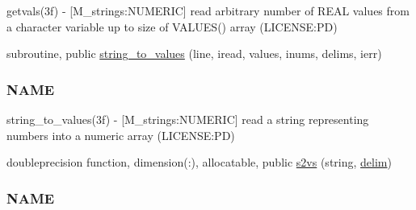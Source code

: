 \begin{DoxyCompactItemize}
\begin{DoxyCompactList}
getvals(3f) -\/ \mbox{[}M\+\_\+strings\+:N\+U\+M\+E\+R\+IC\mbox{]} read arbitrary number of R\+E\+AL values from a character variable up to size of V\+A\+L\+U\+E\+S() array (L\+I\+C\+E\+N\+SE\+:PD) \end{DoxyCompactList}\item 
subroutine, public \mbox{\hyperlink{namespacem__strings_af3767887ce5c2373a6d9061ea6664bfc}{string\+\_\+to\+\_\+values}} (line, iread, values, inums, delims, ierr)
\begin{DoxyCompactList}\small\item\em \subsubsection*{N\+A\+ME}

string\+\_\+to\+\_\+values(3f) -\/ \mbox{[}M\+\_\+strings\+:N\+U\+M\+E\+R\+IC\mbox{]} read a string representing numbers into a numeric array (L\+I\+C\+E\+N\+SE\+:PD) \end{DoxyCompactList}\item 
doubleprecision function, dimension(\+:), allocatable, public \mbox{\hyperlink{namespacem__strings_ad7fffe79559a666aa28e1ed598b8670f}{s2vs}} (string, \mbox{\hyperlink{namespacem__strings_a9890da826d63d6f04367887007611cb5}{delim}})
\begin{DoxyCompactList}\small\item\em \subsubsection*{N\+A\+ME}


\end{DoxyCompactList}
\end{DoxyCompactItemize}
